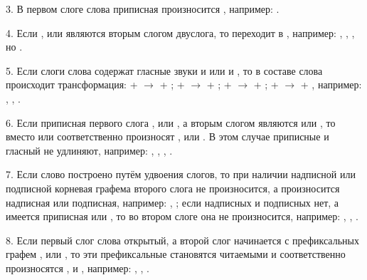 3. В первом слоге слова приписная  произносится , например: .

4. Если ,  или  являются вторым слогом двуслога, то  переходит в , например: , , , но .

5. Если слоги слова содержат гласные звуки  и  или  и , то в составе слова происходит трансформация:  +  $\rightarrow$  + ;  +  $\rightarrow$  + ;  +  $\rightarrow$  + ;  +  $\rightarrow$  + , например: , , .

6. Если приписная первого слога ,  или , а вторым слогом являются  или , то вместо  или  соответственно произносят ,  или . В этом случае приписные  и гласный не удлиняют, например:
,
,
,
.

7. Если слово построено путём удвоения слогов, то при наличии надписной или подписной корневая графема второго слога не произносится, а произносится надписная или подписная, например:
, ;
если надписных и подписных нет, а имеется приписная  или , то во втором слоге она не произносится, например:
,
,
.

8. Если первый слог слова открытый, а второй слог начинается с префиксальных графем ,  или , то эти префиксальные становятся читаемыми и соответственно произносятся ,  и , например:
,
,
.

